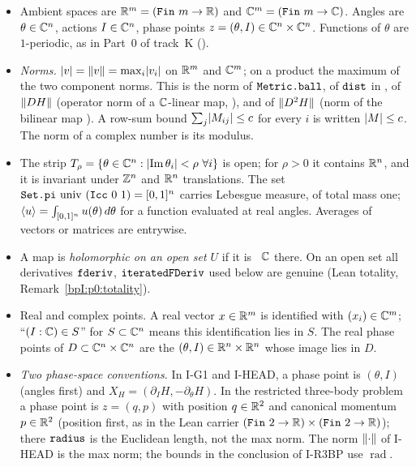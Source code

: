 \begin{itemize}
\item Ambient spaces are $\R^m=(\mathtt{Fin}\ m\to\R)$ and $\C^m=(\mathtt{Fin}\ m\to\C)$. Angles are
  $\theta\in\mathbb{C}^n$, actions $I\in\mathbb{C}^n$, phase points $z=(\theta,I)\in\mathbb{C}^n\times\mathbb{C}^n$. Functions of $\theta$ are
  $1$-periodic, as in Part~0 of track~K ().
\item \emph{Norms.} $\lvert v\rvert=\lVert v\rVert=\max_i\lvert v_i\rvert$ on $\mathbb{R}^m$ and $\mathbb{C}^m$; on a product the maximum of the two
  component norms. This is the norm of $\texttt{Metric.ball}$, of $\texttt{dist}$ in , of $\lVert DH\rVert$
  (operator norm of a $\mathbb{C}$-linear map, ), and of $\lVert D^2H\rVert$ (norm of the bilinear map
  ). A row-sum bound $\sum_j\lvert M_{ij}\rvert\le c$ for every $i$ is written $\lvert M\rvert\le c$.
  The norm of a complex number is its modulus.
\item The strip $T_\rho=\{\theta\in\C^n:\abs{\operatorname{Im}\theta_i}<\rho\ \forall i\}$ is open; for $\rho>0$ it contains
  $\mathbb{R}^n$, and it is invariant under $\mathbb{Z}^n$ and $\mathbb{R}^n$ translations. The set $\texttt{Set.pi}\ \mathrm{univ}\
  (\texttt{Icc}\ 0\ 1)=[0,1]^n$ carries Lebesgue measure, of total mass one; $\langle u\rangle=\int_{[0,1]^n}u(\theta)\,d\theta$
  for a function evaluated at real angles. Averages of vectors or matrices are entrywise.
\item A map is \emph{holomorphic on an open set $U$} if it is \Lean{DifferentiableOn}~$\mathbb{C}$ there. On an open
  set all derivatives $\texttt{fderiv}$, $\texttt{iteratedFDeriv}$ used below are genuine (Lean totality,
  Remark~\ref{bpI:p0:totality}).
\item Real and complex points. A real vector $x\in\mathbb{R}^m$ is identified with $(x_i)\in\mathbb{C}^m$; ``$(I:\mathbb{C})\in S$'' for
  $S\subset\mathbb{C}^n$ means this identification lies in $S$. The real phase points of $D\subset\mathbb{C}^n\times\mathbb{C}^n$ are
  the $(\theta,I)\in\mathbb{R}^n\times\mathbb{R}^n$ whose image lies in $D$.
\item \emph{Two phase-space conventions.} In I-G1 and I-HEAD, a phase point is $(\theta,I)$ (angles first) and
  $X_H=(\partial_IH,-\partial_\theta H)$. In the restricted three-body problem a phase point is $z=(q,p)$ with
  position $q\in\mathbb{R}^2$ and canonical momentum $p\in\mathbb{R}^2$ (position first, as in the Lean carrier
  $(\mathtt{Fin}\ 2\to\R)\times(\mathtt{Fin}\ 2\to\R)$); there $\texttt{radius}$ is the Euclidean length, not the
  max norm. The norm $\lVert \cdot\rVert$ of I-HEAD is the max norm; the bounds in the conclusion of I-R3BP use
  $\operatorname{rad}$.
\end{itemize}

